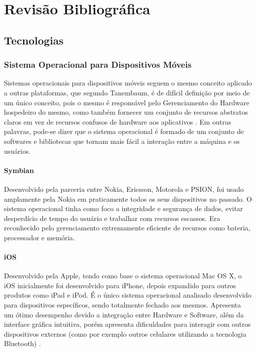 \chapter{Revisão Bibliográfica}

\section{Tecnologias}

\subsection{Sistema Operacional para Dispositivos Móveis}
Sistemas operacionais para dispositivos móveis seguem o mesmo conceito aplicado a outras plataformas, que segundo Tanembaum, é de difícil definição por meio de um único conceito, pois o mesmo é responsável pelo Gerenciamento do Hardware hospedeiro do mesmo, como também fornecer um conjunto de recursos abstratos claros em vez de recursos confusos de hardware aos aplicativos \cite{tanenbaum2010modern}. Em outras palavras, pode-se dizer que o sistema operacional é formado de um conjunto de softwares e bibliotecas que tornam mais fácil a interação entre a máquina e os usuários.

\subsubsection{Symbian}
Desenvolvido pela parceria entre Nokia, Ericsson, Motorola e PSION, foi usado amplamente pela Nokia em praticamente todos os seus dispositivos no passado. O sistema operacional tinha como foco a integridade e segurança de dados, evitar desperdício de tempo do usuário e trabalhar com recursos escassos. Era reconhecido pelo gerenciamento extremamente eficiente de recursos como bateria, processador e memória\cite{SistemasOperacionaisMoveisComputacao}.

\subsubsection{iOS}
Desenvolvido pela Apple, tendo como base o sistema operacional Mac OS X, o iOS inicialmente foi desenvolvido para iPhone, depois expandido para outros produtos como iPad e iPod. É o único sistema operacional analisado desenvolvido para dispositivos específicos, sendo totalmente fechado aos mesmos. Apresenta um ótimo desempenho devido a integração entre Hardware e Software, além da interface gráfica intuitiva, porém apresenta dificuldades para interagir com outros dispositivos externos (como por exemplo outros celulares utilizando a tecnologia Bluetooth) \cite{AvaliacaoComparativaSOMoveis}.

